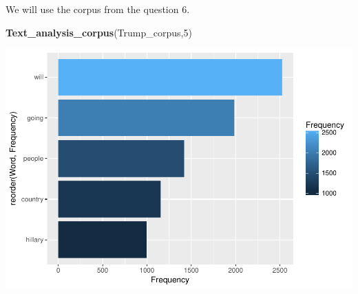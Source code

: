 \documentclass[]{article}
\newenvironment{Shaded}{\begin{snugshade}}{\end{snugshade}}
\newcommand{\KeywordTok}[1]{\textcolor[rgb]{0.13,0.29,0.53}{\textbf{#1}}}
\newcommand{\DecValTok}[1]{\textcolor[rgb]{0.00,0.00,0.81}{#1}}
\newcommand{\NormalTok}[1]{#1}
\begin{document}
We will use the corpus from the question 6.

\begin{Shaded}
\begin{Highlighting}[]
\KeywordTok{Text_analysis_corpus}\NormalTok{(Trump_corpus,}\DecValTok{5}\NormalTok{)}
\end{Highlighting}
\end{Shaded}

\includegraphics{Donald_Trump_Speech_sentiment_analysis_files/figure-latex/unnamed-chunk-41-1.pdf}
\end{document}
